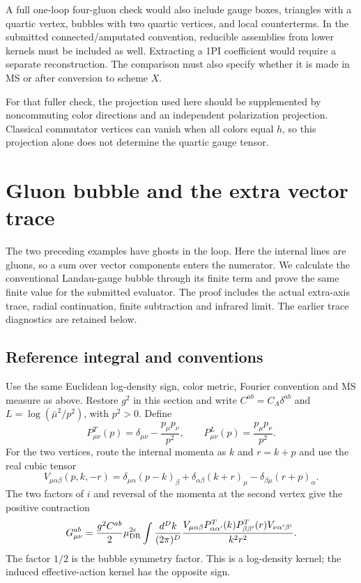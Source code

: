 \documentclass[11pt]{article}
\newcommand{\MS}{\overline{\mathrm{MS}}}
\begin{document}
A full one-loop four-gluon check would also include gauge boxes, triangles
with a quartic vertex, bubbles with two quartic vertices, and local
counterterms. In the submitted connected/amputated convention, reducible
assemblies from lower kernels must be included as well. Extracting a 1PI
coefficient would require a separate reconstruction. The comparison must
also specify whether it is made in MS or after conversion to scheme $X$.

For that fuller check, the projection used here should be supplemented by
noncommuting color directions and an independent polarization projection.
Classical commutator vertices can vanish when all colors equal $h$, so this
projection alone does not determine the quartic gauge tensor.

\section{Gluon bubble and the extra vector trace}
\label{sec:gluon-bubble}

The two preceding examples have ghosts in the loop. Here the internal
lines are gluons, so a sum over vector components enters the numerator.
We calculate the conventional Landau-gauge bubble through its finite term
and prove the same finite value for the submitted evaluator. The proof
includes the actual extra-axis trace, radial continuation, finite subtraction
and infrared limit. The earlier trace diagnostics are retained below.

\subsection{Reference integral and conventions}

Use the same Euclidean log-density sign, color metric, Fourier convention
and $\MS$ measure as above. Restore $g^2$ in this section and write
$C^{ab}=C_A\delta^{ab}$ and $L=\log(\bar\mu^2/p^2)$, with $p^2>0$.
Define
\[
 P^T_{\mu\nu}(p)=\delta_{\mu\nu}-\frac{p_\mu p_\nu}{p^2},
 \qquad P^L_{\mu\nu}(p)=\frac{p_\mu p_\nu}{p^2}.
\]
For the two vertices, route the internal momenta as $k$ and $r=k+p$ and
use the real cubic tensor
\[
 V_{\mu\alpha\beta}(p,k,-r)
 =\delta_{\mu\alpha}(p-k)_\beta
  +\delta_{\alpha\beta}(k+r)_\mu
  -\delta_{\beta\mu}(r+p)_\alpha.
\]
The two factors of $i$ and reversal of the momenta at the second vertex
give the positive contraction
\begin{equation}\label{eq:gluon-integral}
 G^{ab}_{\mu\nu}
 =\frac{g^2C^{ab}}2\mu_{\rm DR}^{2\epsilon}
 \int\frac{d^Dk}{(2\pi)^D}
 \frac{V_{\mu\alpha\beta}P^T_{\alpha\alpha'}(k)
 P^T_{\beta\beta'}(r)V_{\nu\alpha'\beta'}}{k^2r^2}.
\end{equation}
The factor $1/2$ is the bubble symmetry factor. This is a log-density
kernel; the induced effective-action kernel has the opposite sign.
\end{document}
